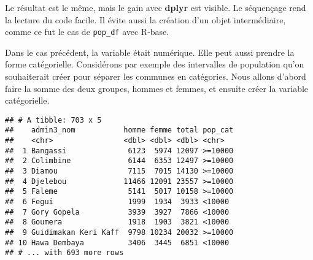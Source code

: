 \documentclass[]{book}
\newenvironment{Shaded}{\begin{snugshade}}{\end{snugshade}}
\newcommand{\KeywordTok}[1]{\textcolor[rgb]{0.13,0.29,0.53}{\textbf{#1}}}
\newcommand{\DecValTok}[1]{\textcolor[rgb]{0.00,0.00,0.81}{#1}}
\newcommand{\StringTok}[1]{\textcolor[rgb]{0.31,0.60,0.02}{#1}}
\newcommand{\CommentTok}[1]{\textcolor[rgb]{0.56,0.35,0.01}{\textit{#1}}}
\newcommand{\OperatorTok}[1]{\textcolor[rgb]{0.81,0.36,0.00}{\textbf{#1}}}
\newcommand{\NormalTok}[1]{#1}
\begin{document}
Le résultat est le même, mais le gain avec \textbf{dplyr} est visible.
Le séquençage rend la lecture du code facile. Il évite aussi la création
d'un objet intermédiaire, comme ce fut le cas de \texttt{pop\_df} avec
R-base.

Dans le cas précédent, la variable était numérique. Elle peut aussi
prendre la forme catégorielle. Considérons par exemple des intervalles
de population qu'on souhaiterait créer pour séparer les communes en
catégories. Nous allons d'abord faire la somme des deux groupes, hommes
et femmes, et ensuite créer la variable catégorielle.

\begin{Shaded}
\end{Shaded}

\begin{verbatim}
## # A tibble: 703 x 5
##    admin3_nom           homme femme total pop_cat
##    <chr>                <dbl> <dbl> <dbl> <chr>  
##  1 Bangassi              6123  5974 12097 >=10000
##  2 Colimbine             6144  6353 12497 >=10000
##  3 Diamou                7115  7015 14130 >=10000
##  4 Djelebou             11466 12091 23557 >=10000
##  5 Faleme                5141  5017 10158 >=10000
##  6 Fegui                 1999  1934  3933 <10000 
##  7 Gory Gopela           3939  3927  7866 <10000 
##  8 Goumera               1918  1903  3821 <10000 
##  9 Guidimakan Keri Kaff  9798 10234 20032 >=10000
## 10 Hawa Dembaya          3406  3445  6851 <10000 
## # ... with 693 more rows
\end{verbatim}
\end{document}
